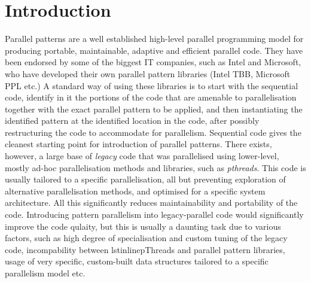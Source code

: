 \section{Introduction}

Parallel patterns are a well established high-level parallel programming model for producing portable, maintainable, adaptive and efficient parallel code. They have been endorsed by some of the biggest IT companies, such as Intel and Microsoft, who have developed their own parallel pattern libraries (Intel TBB, Microsoft PPL etc.) A standard way of using these libraries is to start with the sequential code, identify in it the portions of the code that are amenable to parallelisation together with the exact parallel pattern to be applied, and then instantiating the identified pattern at the identified location in the code, after possibly restructuring the code to accommodate for parallelism. Sequential code gives the cleanest starting point for introduction of parallel patterns. There exists, however, a large base of \emph{legacy} code that was parallelised using lower-level, mostly ad-hoc parallelisation methods and libraries, such as \emph{pthreads}. This code is usually tailored to a specific parallelisation, all but preventing exploration of alternative parallelisation methods, and optimised for a specific system architecture. All this significantly reduces maintainability and portability of the code. %
Introducing pattern parallelism into legacy-parallel code would significantly improve the code qulaity, but this is usually a daunting task due to various factors, such as high degree of specialisation and custom tuning of the legacy code, incompability between lstinline{pThreads} and parallel pattern libraries, usage of very specific, custom-built data structures tailored to a specific parallelism model etc.
  
